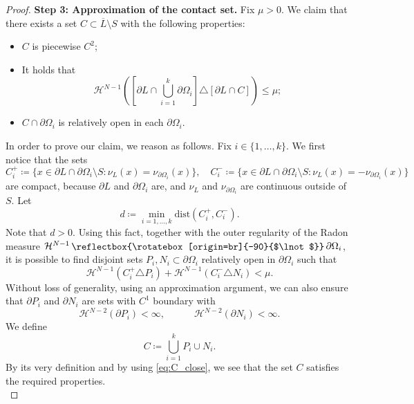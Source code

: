\documentclass[a4paper, 11pt, reqno]{amsart}
\theoremstyle{plain}
\theoremstyle{definition}
\theoremstyle{remark}
\newcommand{\hno}{{\mathcal H}^{N-1}}
\newcommand{\restr}{%
  \,\raisebox{-.127ex}{\reflectbox{\rotatebox[origin=br]{-90}{$\lnot$}}}\,%
}
\begin{document}
\begin{proof}
\textbf{Step 3: Approximation of the contact set.}
Fix $\mu>0$.
We claim that there exists a set $C\subset \overline{L}\setminus S$ with the following properties:
\begin{itemize}
\item[(1)] $C$ is piecewise $C^2$;
\item[(2)] It holds that
\[
\hno\left( \left[\partial L \cap \bigcup_{i=1}^k \partial\Omega_i \right] \triangle \left[ \partial L \cap C \right] \right) \leq\mu;
\]
\item[(3)] $C\cap \partial \Omega_i$ is relatively open in each $\partial \Omega_i$.
\end{itemize}
In order to prove our claim, we reason as follows.
Fix $i\in\{1,\dots,k\}$.
We first notice that the sets
\[
C_i^+\coloneqq \{ x\in \partial L \cap \partial\Omega_i\setminus S : \nu_L(x)=\nu_{\partial\Omega_i}(x) \},\quad
C_i^-\coloneqq \{ x\in \partial L \cap \partial\Omega_i\setminus S : \nu_L(x)=-\nu_{\partial\Omega_i}(x) \}
\]
are compact, because $\partial L$ and $\partial\Omega_i$ are, and $\nu_L$ and $\nu_{\partial\Omega_i}$ are continuous outside of $S$.
Let 
\[
d \coloneqq \min_{i=1,\dots,k} \mathrm{dist}(C^+_i, C^-_i).
\]
Note that $d>0$.
Using this fact, together with the outer regularity of the Radon measure $\hno\restr\partial\Omega_i$, it is possible to find disjoint sets $P_i, N_i\subset\partial\Omega_i$ relatively open in $\partial\Omega_i$ such that
\begin{equation}\label{eq:C_close}
\hno(C^+_i \triangle P_i) + \hno(C^-_i \triangle N_i) < \mu.
\end{equation}
Without loss of generality, using an approximation argument, we can also ensure that $\partial P_i$ and $\partial N_i$ are sets with $C^1$ boundary with
\begin{equation}\label{eq:boundary_Pi_Ci}
\mathcal{H}^{N-2}(\partial P_i)<\infty, \quad\quad\quad
\mathcal{H}^{N-2}(\partial N_i)<\infty.
\end{equation}
We define
\[
C\coloneqq \bigcup_{i=1}^k P_i\cup N_i.
\]
By its very definition and by using \eqref{eq:C_close}, we see that the set $C$ satisfies the required properties.\\


\end{proof}
\end{document}
